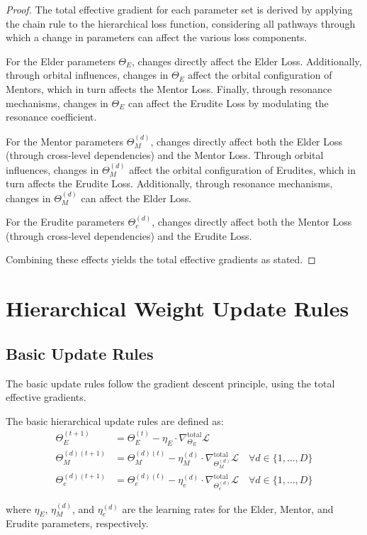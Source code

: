 \begin{proof}
The total effective gradient for each parameter set is derived by applying the chain rule to the hierarchical loss function, considering all pathways through which a change in parameters can affect the various loss components.

For the Elder parameters $\Theta_E$, changes directly affect the Elder Loss. Additionally, through orbital influences, changes in $\Theta_E$ affect the orbital configuration of Mentors, which in turn affects the Mentor Loss. Finally, through resonance mechanisms, changes in $\Theta_E$ can affect the Erudite Loss by modulating the resonance coefficient.

For the Mentor parameters $\Theta_M^{(d)}$, changes directly affect both the Elder Loss (through cross-level dependencies) and the Mentor Loss. Through orbital influences, changes in $\Theta_M^{(d)}$ affect the orbital configuration of Erudites, which in turn affects the Erudite Loss. Additionally, through resonance mechanisms, changes in $\Theta_M^{(d)}$ can affect the Elder Loss.

For the Erudite parameters $\Theta_e^{(d)}$, changes directly affect both the Mentor Loss (through cross-level dependencies) and the Erudite Loss.

Combining these effects yields the total effective gradients as stated.
\end{proof}

\section{Hierarchical Weight Update Rules}

\subsection{Basic Update Rules}

The basic update rules follow the gradient descent principle, using the total effective gradients.

\begin{definition}
The basic hierarchical update rules are defined as:
\begin{align}
\Theta_E^{(t+1)} &= \Theta_E^{(t)} - \eta_E \cdot \nabla_{\Theta_E}^{\text{total}} \mathcal{L} \\
\Theta_M^{(d)(t+1)} &= \Theta_M^{(d)(t)} - \eta_M^{(d)} \cdot \nabla_{\Theta_M^{(d)}}^{\text{total}} \mathcal{L} \quad \forall d \in \{1, \ldots, D\} \\
\Theta_e^{(d)(t+1)} &= \Theta_e^{(d)(t)} - \eta_e^{(d)} \cdot \nabla_{\Theta_e^{(d)}}^{\text{total}} \mathcal{L} \quad \forall d \in \{1, \ldots, D\}
\end{align}

where $\eta_E$, $\eta_M^{(d)}$, and $\eta_e^{(d)}$ are the learning rates for the Elder, Mentor, and Erudite parameters, respectively.
\end{definition}

